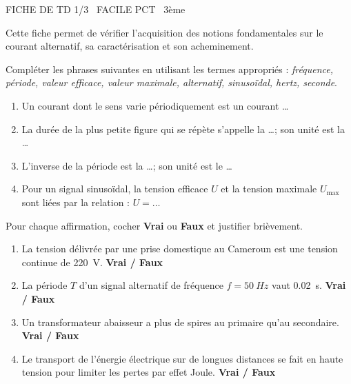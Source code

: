 \documentclass[11pt]{article}
\begin{document}
\begin{tcolorbox}[enhanced,colback=popink,colframe=popink,arc=10pt,boxrule=0pt,left=12pt,right=12pt,top=9pt,bottom=9pt]
{\color{white}\popxbold\small FICHE DE TD 1/3 \textbullet\ FACILE \hfill PCT \textbullet\ 3ème\par}
\end{tcolorbox}
\vspace{4pt}
Cette fiche permet de vérifier l'acquisition des notions fondamentales sur le courant alternatif, sa caractérisation et son acheminement.

\begin{exercice}
Compléter les phrases suivantes en utilisant les termes appropriés : \textit{fréquence, période, valeur efficace, valeur maximale, alternatif, sinusoïdal, hertz, seconde}.
\begin{enumerate}
    \item Un courant dont le sens varie périodiquement est un courant \ldots
    \item La durée de la plus petite figure qui se répète s'appelle la \ldots ; son unité est la \ldots
    \item L'inverse de la période est la \ldots ; son unité est le \ldots
    \item Pour un signal sinusoïdal, la tension efficace $U$ et la tension maximale $U_{\text{max}}$ sont liées par la relation : $U = \ldots$
\end{enumerate}
\end{exercice}

\begin{exercice}
Pour chaque affirmation, cocher \textbf{Vrai} ou \textbf{Faux} et justifier brièvement.
\begin{enumerate}
    \item La tension délivrée par une prise domestique au Cameroun est une tension continue de \SI{220}{V}. \hfill \textbf{Vrai / Faux}
    \item La période $T$ d'un signal alternatif de fréquence $f = \SI{50}{Hz}$ vaut \SI{0,02}{s}. \hfill \textbf{Vrai / Faux}
    \item Un transformateur abaisseur a plus de spires au primaire qu'au secondaire. \hfill \textbf{Vrai / Faux}
    \item Le transport de l'énergie électrique sur de longues distances se fait en haute tension pour limiter les pertes par effet Joule. \hfill \textbf{Vrai / Faux}
\end{enumerate}
\end{exercice}
\end{document}
